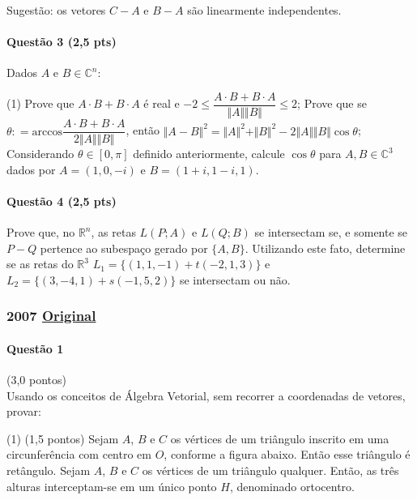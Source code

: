 \documentclass[12pt,a4paper]{article}
\newcommand{\R}{\mathbb{R}}
\newcommand{\C}{\mathbb{C}}
\newcommand{\norm}[1]{\Vert #1 \Vert}
\newcommand{\original}[1]{\tiny \href{#1}{Original} \normalsize}
\begin{document}
Sugestão: os vetores $C-A$ e $B-A$ são linearmente independentes.

\paragraph{Questão 3 (2,5 pts)} Dados $A$ e $B\in \C ^n$:

\begin{tasks}(1)
\task Prove que $A\cdot B+B\cdot A$ é real e $-2 \le \dfrac{A\cdot B + B\cdot A}{\norm{A}\norm{B}} \le 2$;
\task Prove que se $\theta : = \mathrm{arccos} \dfrac{A\cdot B + B\cdot A}{2\norm{A}\norm{B}}$, então $\norm{A-B}^2 = \norm{A}^2 + \norm{B}^2 - 2\norm{A}\norm{B}\cos \theta$;
\task Considerando $\theta \in [0,\pi]$ definido anteriormente, calcule $\cos \theta$ para $A, B \in \C^3$ dados por $A=(1,0,-i)$ e $B=(1+i, 1-i, 1)$.
\end{tasks}

\paragraph{Questão 4 (2,5 pts)} Prove que, no $\R^n$, as retas $L(P;A)$ e $L(Q;B)$ se intersectam se, e somente se $P-Q$ pertence ao subespaço gerado por $\{A,B\}$. Utilizando este fato, determine se as retas do $\R^3$ $L_1=\{(1,1,-1)+t(-2,1,3) \}$ e $L_2 = \{(3,-4,1)+s(-1,5,2) \}$ se intersectam ou não.

\newpage

\subsubsection{2007 \original{https://drive.google.com/file/d/1GfMdrGdJLV1xukAoFEDlLR7_gPH-VDFW/view?usp=sharing}}

\paragraph{Questão 1} (3,0 pontos)\\
Usando os conceitos de Álgebra Vetorial, sem recorrer a coordenadas de vetores, provar:
\begin{tasks}(1)
\task (1,5 pontos) Sejam $A$, $B$ e $C$ os vértices de um triângulo inscrito em uma circunferência com centro em $O$, conforme a figura abaixo. Então esse triângulo é retângulo.
\task Sejam $A$, $B$ e $C$ os vértices de um triângulo qualquer. Então, as três alturas interceptam-se em um único ponto $H$, denominado ortocentro.
\end{tasks}
\end{document}
